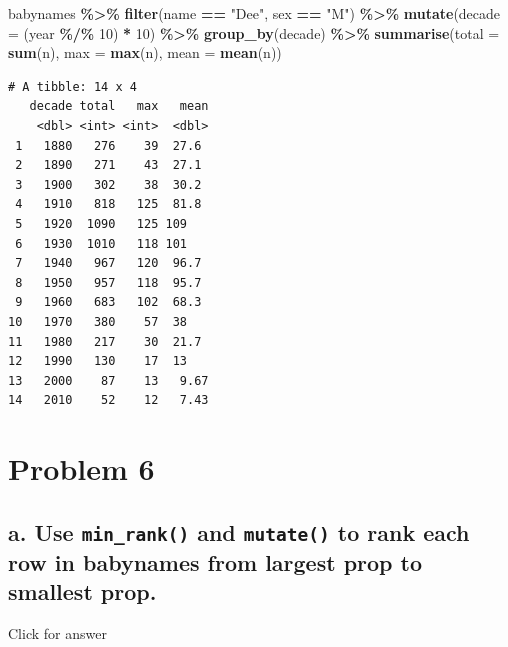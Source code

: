 \documentclass[
]{book}
\newenvironment{Shaded}{\begin{snugshade}}{\end{snugshade}}
\newcommand{\AttributeTok}[1]{\textcolor[rgb]{0.13,0.29,0.53}{#1}}
\newcommand{\DecValTok}[1]{\textcolor[rgb]{0.00,0.00,0.81}{#1}}
\newcommand{\FunctionTok}[1]{\textcolor[rgb]{0.13,0.29,0.53}{\textbf{#1}}}
\newcommand{\NormalTok}[1]{#1}
\newcommand{\SpecialCharTok}[1]{\textcolor[rgb]{0.81,0.36,0.00}{\textbf{#1}}}
\newcommand{\StringTok}[1]{\textcolor[rgb]{0.31,0.60,0.02}{#1}}
\begin{document}
\begin{Shaded}
\begin{Highlighting}[]
\NormalTok{babynames }\SpecialCharTok{\%\textgreater{}\%} 
  \FunctionTok{filter}\NormalTok{(name }\SpecialCharTok{==} \StringTok{"Dee"}\NormalTok{, sex }\SpecialCharTok{==} \StringTok{"M"}\NormalTok{) }\SpecialCharTok{\%\textgreater{}\%} 
  \FunctionTok{mutate}\NormalTok{(}\AttributeTok{decade =}\NormalTok{ (year }\SpecialCharTok{\%/\%} \DecValTok{10}\NormalTok{) }\SpecialCharTok{*} \DecValTok{10}\NormalTok{) }\SpecialCharTok{\%\textgreater{}\%} 
  \FunctionTok{group\_by}\NormalTok{(decade) }\SpecialCharTok{\%\textgreater{}\%}
  \FunctionTok{summarise}\NormalTok{(}\AttributeTok{total =} \FunctionTok{sum}\NormalTok{(n),}
            \AttributeTok{max =} \FunctionTok{max}\NormalTok{(n), }
            \AttributeTok{mean =} \FunctionTok{mean}\NormalTok{(n))}
\end{Highlighting}
\end{Shaded}

\begin{verbatim}
# A tibble: 14 x 4
   decade total   max   mean
    <dbl> <int> <int>  <dbl>
 1   1880   276    39  27.6 
 2   1890   271    43  27.1 
 3   1900   302    38  30.2 
 4   1910   818   125  81.8 
 5   1920  1090   125 109   
 6   1930  1010   118 101   
 7   1940   967   120  96.7 
 8   1950   957   118  95.7 
 9   1960   683   102  68.3 
10   1970   380    57  38   
11   1980   217    30  21.7 
12   1990   130    17  13   
13   2000    87    13   9.67
14   2010    52    12   7.43
\end{verbatim}

\hypertarget{problem-6}{%
\section{Problem 6}\label{problem-6}}

\hypertarget{a.-use-min_rank-and-mutate-to-rank-each-row-in-babynames-from-largest-prop-to-smallest-prop.}{%
\subsection{\texorpdfstring{a. Use \texttt{min\_rank()} and \texttt{mutate()} to rank each row in babynames from largest prop to smallest prop.}{a. Use min\_rank() and mutate() to rank each row in babynames from largest prop to smallest prop.}}\label{a.-use-min_rank-and-mutate-to-rank-each-row-in-babynames-from-largest-prop-to-smallest-prop.}}

Click for answer
\end{document}
